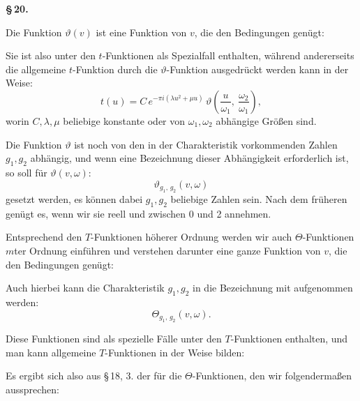 
\begin{center}
\textbf{\S\,20. }
\end{center}

Die Funktion $\vartheta(v)$ ist eine  Funktion von $v$, die den
Bedingungen gen\"ugt:


 Sie ist also unter den $t$-Funktionen als Spezialfall
enthalten, w\"ahrend andererseits die allgemeine $t$-Funktion durch
die $\vartheta$-Funktion ausgedr\"uckt werden kann in der Weise:
\[
t(u) = C\, e^{-\pi i(\lambda u^2 + \mu u)}\, \vartheta\!\left(\frac{u}{\omega_1},\ \frac{\omega_2}{\omega_1}\right),
\]
worin $C, \lambda, \mu$ beliebige konstante oder von $\omega_1, \omega_2$ abh\"angige
Gr\"o\ss en sind.

Die Funktion $\vartheta$ ist noch von den in der Charakteristik vorkommenden
 Zahlen $g_1, g_2$ abh\"angig, und wenn eine Bezeichnung
dieser Abh\"angigkeit erforderlich ist, so soll f\"ur $\vartheta(v, \omega)$:
\[
\vartheta_{g_1,\, g_2}(v, \omega)
\]
gesetzt werden, es k\"onnen dabei $g_1, g_2$ beliebige Zahlen sein.
Nach dem fr\"uheren gen\"ugt es, wenn wir sie reell und zwischen 0
und 2 annehmen.

Entsprechend den $T$-Funktionen h\"oherer Ordnung werden
wir auch $\Theta$-Funktionen $m$ter Ordnung einf\"uhren und verstehen
darunter eine ganze Funktion von $v$, die den Bedingungen gen\"ugt:


Auch hierbei kann die Charakteristik $g_1, g_2$ in die Bezeichnung
 mit aufgenommen werden:
\[
\Theta_{g_1,\, g_2}(v, \omega).
\]

Diese Funktionen sind als spezielle F\"alle unter den $T$-Funktionen
 enthalten, und man kann allgemeine $T$-Funktionen in der
Weise bilden:


Es ergibt sich also aus \S\,18, 3. der  f\"ur
die $\Theta$-Funktionen, den wir folgenderma\ss en aussprechen:
